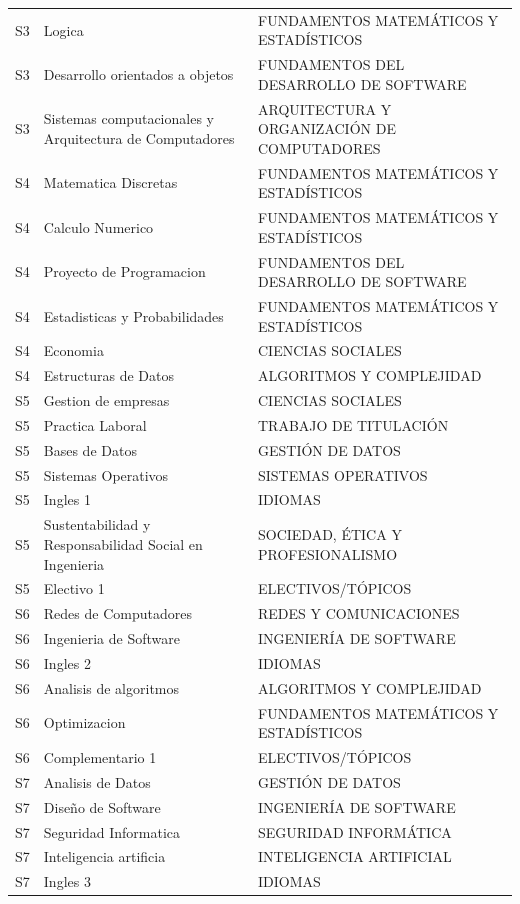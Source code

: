 \documentclass[11pt,a4paper]{article}
\begin{document}
\begin{small}
\begin{longtable}{c >{\raggedright\arraybackslash}p{8.5cm} >{\raggedright\arraybackslash}p{5.5cm}}
S3 & Logica & FUNDAMENTOS MATEMÁTICOS Y ESTADÍSTICOS \\
S3 & Desarrollo orientados a objetos & FUNDAMENTOS DEL DESARROLLO DE SOFTWARE \\
S3 & Sistemas computacionales y Arquitectura de Computadores & ARQUITECTURA Y ORGANIZACIÓN DE COMPUTADORES \\
S4 & Matematica Discretas & FUNDAMENTOS MATEMÁTICOS Y ESTADÍSTICOS \\
S4 & Calculo Numerico & FUNDAMENTOS MATEMÁTICOS Y ESTADÍSTICOS \\
S4 & Proyecto de Programacion & FUNDAMENTOS DEL DESARROLLO DE SOFTWARE \\
S4 & Estadisticas y Probabilidades & FUNDAMENTOS MATEMÁTICOS Y ESTADÍSTICOS \\
S4 & Economia & CIENCIAS SOCIALES \\
S4 & Estructuras de Datos & ALGORITMOS Y COMPLEJIDAD \\
S5 & Gestion de empresas & CIENCIAS SOCIALES \\
S5 & Practica Laboral & TRABAJO DE TITULACIÓN \\
S5 & Bases de Datos & GESTIÓN DE DATOS \\
S5 & Sistemas Operativos & SISTEMAS OPERATIVOS \\
S5 & Ingles 1 & IDIOMAS \\
S5 & Sustentabilidad y Responsabilidad Social en Ingenieria & SOCIEDAD, ÉTICA Y PROFESIONALISMO \\
S5 & Electivo 1 & ELECTIVOS/TÓPICOS \\
S6 & Redes de Computadores & REDES Y COMUNICACIONES \\
S6 & Ingenieria de Software & INGENIERÍA DE SOFTWARE \\
S6 & Ingles 2 & IDIOMAS \\
S6 & Analisis de algoritmos & ALGORITMOS Y COMPLEJIDAD \\
S6 & Optimizacion & FUNDAMENTOS MATEMÁTICOS Y ESTADÍSTICOS \\
S6 & Complementario 1 & ELECTIVOS/TÓPICOS \\
S7 & Analisis de Datos & GESTIÓN DE DATOS \\
S7 & Diseño de Software & INGENIERÍA DE SOFTWARE \\
S7 & Seguridad Informatica & SEGURIDAD INFORMÁTICA \\
S7 & Inteligencia artificia & INTELIGENCIA ARTIFICIAL \\
S7 & Ingles 3 & IDIOMAS \\

\end{longtable}
\end{small}
\end{document}
